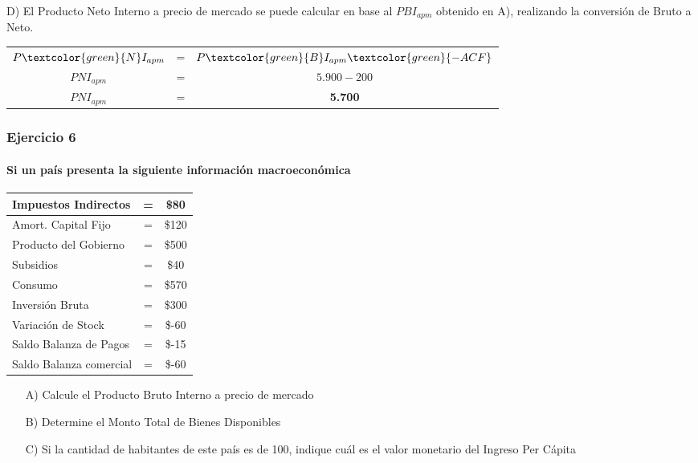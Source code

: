 \documentclass[12pt,a4paper]{article}
\newcommand{\consigna}[1]{\paragraph{\indent #1} \hspace{0pt}}
\begin{document}
        \hrulefill
        
        D) El Producto Neto Interno a precio de mercado se puede calcular en base al $PBI_{apm}$ obtenido en A), realizando la conversión de Bruto a Neto.
        
		\begin{table}[H]
		\centering
        	\begin{tabular}{ c c c }
               	$ P\textcolor{green}{N}I_{apm} $ &=& $ P\textcolor{green}{B}I_{apm} \textcolor{green}{ - ACF} $ \\
                $ PNI_{apm} $ &=& $ 5{.}900 - 200 $ \\
                $ PNI_{apm} $ &=& \textbf{5.700}
			\end{tabular}
		\end{table}
        
        
        \newpage
    
    	\subsubsection{Ejercicio 6}
        
        \consigna{Si un país presenta la siguiente información macroeconómica}
        
        \begin{table}[H]
        \centering
        	\begin{tabular}{ | l c c | }
            \hline
            Impuestos Indirectos	& =	& \$80 \\ \hline
            Amort. Capital Fijo		& =	& \$120 \\ \hline
            Producto del Gobierno	& =	& \$500 \\ \hline
            Subsidios				& =	& \$40 \\ \hline
            Consumo					& =	& \$570 \\ \hline
            Inversión Bruta			& =	& \$300 \\ \hline
            Variación de Stock		& =	& \$-60 \\ \hline
            Saldo Balanza de Pagos	& =	& \$-15 \\ \hline
            Saldo Balanza comercial	& =	& \$-60 \\ \hline
			\end{tabular}
		\end{table}
        
        \begin{itemize}
			\item[A)]	Calcule el Producto Bruto Interno a precio de mercado
            \item[B)]	Determine el Monto Total de Bienes Disponibles
            \item[C)]	Si la cantidad de habitantes de este país es de 100, indique cuál es el valor monetario del Ingreso Per Cápita
		\end{itemize}
        
\end{document}
